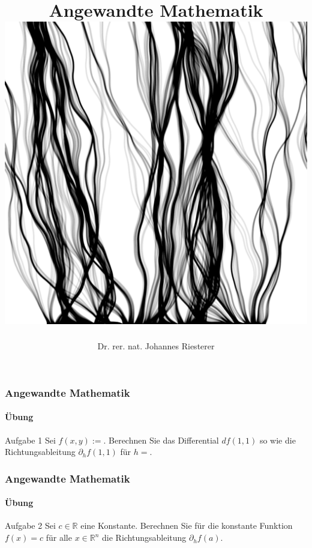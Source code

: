 \documentclass{beamer}
\begin{document}
\title[Angewandte Mathematik] %
{Angewandte Mathematik
\\
\includegraphics[scale=0.15]{images/cover}
}
\subtitle{}
\author[Dr. Johannes Riesterer] %
{Dr.  rer. nat. Johannes Riesterer}

\date[KPT 2004] %
{}

\subject{Übungen zu Angewandte Mathematik}

\frame{\titlepage}




\begin{frame}
    \frametitle{Angewandte Mathematik}
\framesubtitle{Übung}
\begin{block}{Aufgabe 1}
Sei $f(x,y) := $. Berechnen Sie das Differential $df(1,1)$ so wie die Richtungsableitung $\partial_h f (1,1)$ für $h= $.
\end{block}
 \end{frame}


\begin{frame}
    \frametitle{Angewandte Mathematik}
\framesubtitle{Übung}
\begin{block}{Aufgabe 2}
Sei $c \in \mathbb{R}$ eine Konstante. Berechnen Sie für die  konstante Funktion $f(x) = c$ für alle $x \in \mathbb{R}^n$ die Richtungsableitung $\partial_h f(a)$.
\end{block}
 \end{frame}
\end{document}
